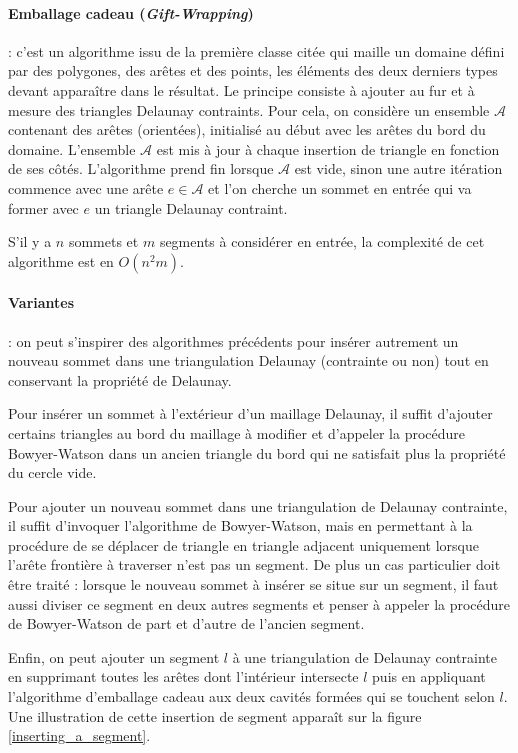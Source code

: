 \documentclass[12pt,a4paper]{report}
\begin{document}
\paragraph{\indent Emballage cadeau (\emph{Gift-Wrapping})} : c'est un algorithme issu de la première classe citée qui maille un domaine défini par des polygones, des arêtes et des points, les éléments des deux derniers types devant apparaître dans le résultat. Le principe consiste à ajouter au fur et à mesure des triangles Delaunay contraints. Pour cela, on considère un ensemble $\mathcal{A}$ contenant des arêtes (orientées), initialisé au début avec les arêtes du bord du domaine. L'ensemble $\mathcal{A}$ est mis à jour à chaque insertion de triangle en fonction de ses côtés. L'algorithme prend fin lorsque $\mathcal{A}$ est vide, sinon une autre itération commence avec une arête $e\in\mathcal{A}$ et l'on cherche un sommet en entrée qui va former avec $e$ un triangle Delaunay contraint.

S'il y a $n$ sommets et $m$ segments à considérer en entrée, la complexité de cet algorithme est en $O(n^{2}m)$.

\paragraph{Variantes} : on peut s'inspirer des algorithmes précédents pour insérer autrement un nouveau sommet dans une triangulation Delaunay (contrainte ou non) tout en conservant la propriété de Delaunay.

Pour insérer un sommet à l'extérieur d'un maillage Delaunay, il suffit d'ajouter certains triangles au bord du maillage à modifier et d'appeler la procédure Bowyer-Watson dans un ancien triangle du bord qui ne satisfait plus la propriété du cercle vide.

Pour ajouter un nouveau sommet dans une triangulation de Delaunay contrainte, il suffit d'invoquer l'algorithme de Bowyer-Watson, mais en permettant à la procédure de se déplacer de triangle en triangle adjacent uniquement lorsque l'arête frontière à traverser n'est pas un segment. De plus un cas particulier doit être traité : lorsque le nouveau sommet à insérer se situe sur un segment, il faut aussi diviser ce segment en deux autres segments et penser à appeler la procédure de Bowyer-Watson de part et d'autre de l'ancien segment.

Enfin, on peut ajouter un segment $l$ à une triangulation de Delaunay contrainte en supprimant toutes les arêtes dont l'intérieur intersecte $l$ puis en appliquant l'algorithme d'emballage cadeau aux deux cavités formées qui se touchent selon $l$. Une illustration de cette insertion de segment apparaît sur la figure \ref{inserting_a_segment}.
\end{document}
